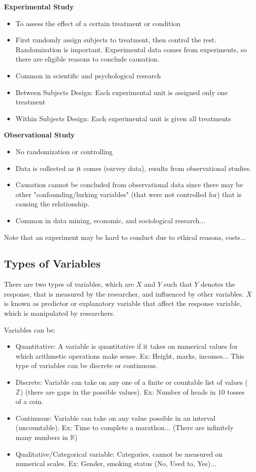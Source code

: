 \documentclass[a4paper,11pt]{article}
\newcommand{\R}{\mathbb{R}}
\newcommand{\Z}{\mathbb{Z}}
\begin{document}
\textbf{Experimental Study}
\begin{itemize}
\item To assess the effect of a certain treatment or condition
\item First randomly assign subjects to treatment, then control the rest. Randomization is important. Experimental data comes from experiments, so there are eligible reasons to conclude {causation}. 
\item Common in scientific and psychological research
\item {Between Subjects Design}: Each experimental unit is assigned only one treatment
\item {Within Subjects Design}: Each experimental unit is given all treatments
\end{itemize}
\textbf{Observational Study}
\begin{itemize}
\item No randomization or controlling
\item Data is collected as it comes (survey data), results from observational studies. 
\item Causation cannot be concluded from observational data since there may be other "confounding/lurking variables" (that were not controlled for) that is causing the relationship. 
\item Common in data mining, economic, and sociological research... 
\end{itemize}
Note that an experiment may be hard to conduct due to ethical reasons, costs... 
\subsection{Types of Variables}
There are two types of variables, which are $X$ and $Y$ such that $Y$ denotes the response, that is measured by the researcher, and influenced by other variables. $X$ is known as predictor or explanatory variable that affect the response variable, which is manipulated by researchers. 

Variables can be:
\begin{itemize}
\item Quantitative: A variable is quantitative if it takes on numerical values for which arithmetic operations make sense. Ex: Height, marks, incomes... This type of variables can be discrete or continuous. 
\item Discrete: Variable can take on any one of a finite or countable list of values ($\Z$) (there are gaps in the possible values). Ex: Number of heads in 10 tosses of a coin. 
\item Continuous: Variable can take on any value possible in an interval (uncountable). Ex: Time to complete a marathon... (There are infinitely many numbers in $\R$)
\item Qualitative/Categorical variable: Categories, cannot be measured on numerical scales. Ex: Gender, smoking status (No, Used to, Yes)... 
\end{itemize}
\end{document}
